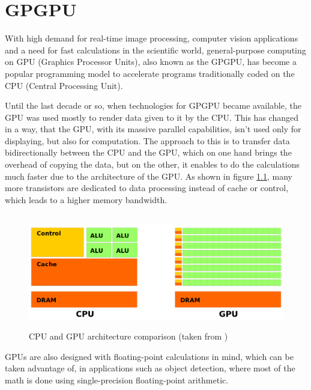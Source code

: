 
\chapter{GPGPU}

With high demand for real-time image processing, computer vision applications and a need for fast calculations in the scientific world, general-purpose computing on GPU (Graphics Processor Units), also known as the GPGPU, has become a popular programming model to accelerate programs traditionally coded on the CPU (Central Processing Unit).

Until the last decade or so, when technologies for GPGPU became available, the GPU was used mostly to render data given to it by the CPU. This has changed in a way, that the GPU, with its massive parallel capabilities, isn't used only for displaying, but also for computation. The approach to this is to transfer data bidirectionally between the CPU and the GPU, which on one hand brings the overhead of copying the data, but on the other, it enables to do the calculations much faster due to the architecture of the GPU. As shown in figure \ref{fig:cpu-gpu}, many more transistors are dedicated to data processing instead of cache or control, which leads to a higher memory bandwidth.

\begin{center}
\begin{figure}[ht]
	\centering\includegraphics[height=5cm]{fig/cpu-gpu.png}
	\caption{CPU and GPU architecture comparison (taken from \cite{cuda-toolkit-docs})}
	\label{fig:cpu-gpu}
\end{figure}
\end{center}

GPUs are also designed with floating-point calculations in mind, which can be taken advantage of, in applications such as object detection, where most of the math is done using single-precision floating-point arithmetic.

